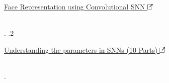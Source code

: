 \documentclass[]{rahulworld-resume}
\begin{document}
\begin{minipage}[t]{0.97\textwidth}
\begin{minipage}{\linewidth}
{\begin{minipage}{0.84\textwidth}
				\large\href{https://github.com/BehzadShayegh/Face-Representation-using-Convolutional-SNNs}{Face Representation using Convolutional SNN \includegraphics[width=8pt]{icons/redirect.png}}
				\\\vspace{3pt}
				\normalfont\normalsize{}
				\\\vspace{3pt}
			\end{minipage}.
			.2  \begin{minipage}{0.84\textwidth}\vspace{3pt}\normalfont
				\large\href{https://behzadshayegh.github.io/Assignments-CNS-Spring2021}{Understanding the parameters in SNNs (10 Parts) \includegraphics[width=8pt]{icons/redirect.png}}
				\\\vspace{3pt}
				\normalfont\normalsize{}
				\\\vspace{3pt}
			\end{minipage}.
		}
	\end{minipage}
	\vspace{10pt}


\end{minipage}
\end{document}
